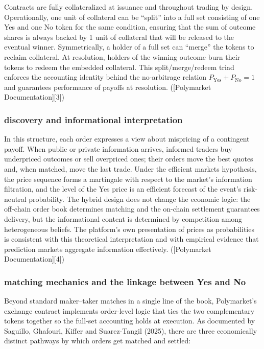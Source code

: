 Contracts are fully collateralized at issuance and throughout trading by design. Operationally, one unit of collateral can be “split” into a full set consisting of one Yes and one No token for the same condition, ensuring that the sum of outcome shares is always backed by 1 unit of collateral that will be released to the eventual winner. Symmetrically, a holder of a full set can “merge” the tokens to reclaim collateral. At resolution, holders of the winning outcome burn their tokens to redeem the embedded collateral. This split/merge/redeem triad enforces the accounting identity behind the no-arbitrage relation $P_{\text{Yes}} + P_{\text{No}} = 1$ and guarantees performance of payoffs at resolution. ([Polymarket Documentation][3])

\subsubsection{discovery and informational interpretation}

In this structure, each order expresses a view about mispricing of a contingent payoff. When public or private information arrives, informed traders buy underpriced outcomes or sell overpriced ones; their orders move the best quotes and, when matched, move the last trade. Under the efficient markets hypothesis, the price sequence forms a martingale with respect to the market’s information filtration, and the level of the Yes price is an efficient forecast of the event’s risk-neutral probability. The hybrid design does not change the economic logic: the off-chain order book determines matching and the on-chain settlement guarantees delivery, but the informational content is determined by competition among heterogeneous beliefs. The platform’s own presentation of prices as probabilities is consistent with this theoretical interpretation and with empirical evidence that prediction markets aggregate information effectively. ([Polymarket Documentation][4])

\subsubsection{matching mechanics and the linkage between Yes and No}

Beyond standard maker–taker matches in a single line of the book, Polymarket’s exchange contract implements order-level logic that ties the two complementary tokens together so the full-set accounting holds at execution. As documented by Saguillo, Ghafouri, Kiffer and Suarez-Tangil (2025), there are three economically distinct pathways by which orders get matched and settled:

